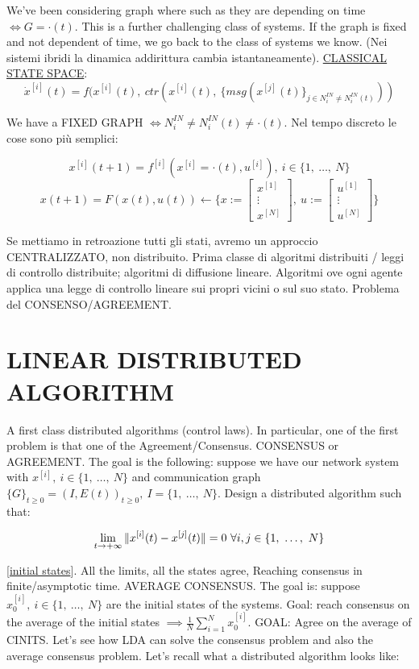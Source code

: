 We've been considering graph where such as they are depending on time $\iff G=\mathord{\cdot}(t)$. This is a further challenging class of systems. If the graph is fixed and not dependent of time, we go back to the class of systems we know. (Nei sistemi ibridi la dinamica addirittura cambia istantaneamente). \underline{CLASSICAL STATE SPACE}:
\[	
	\dot{x}^{[i]}(t) = f(x^{[i]}(t),\ ctr(x^{[i]}(t),\ \{msg(x^{[j]}(t)\}_{j\in N_i^{IN}\neq N_i^{IN}(t)}))
\]

We have a FIXED GRAPH $\iff N_i^{IN} \neq N_i^{IN}(t) \neq \mathord{\cdot}(t)$. Nel tempo discreto le cose sono più semplici:

\[
	x^{[i]}(t+1) = f^{[i]}(x^{[i]}=\mathord{\cdot}(t),u^{[i]}),\ i \in \{1,\ \dots,\ N\}
\]
\[
	x(t+1) = F(x(t),u(t)) \leftarrow \Biggl\{ x:=\begin{bmatrix}x^{[1]}\\ \vdots\\x^{[N]}\end{bmatrix},\ 
	u := \begin{bmatrix}u^{[1]}\\ \vdots\\ u^{[N]}\end{bmatrix}\Biggr\}
\]

Se mettiamo in retroazione tutti gli stati, avremo un approccio CENTRALIZZATO, non distribuito.
Prima classe di algoritmi distribuiti / leggi di controllo distribuite; algoritmi di diffusione lineare. Algoritmi ove ogni agente applica una legge di controllo lineare sui propri vicini o sul suo stato. Problema del CONSENSO/AGREEMENT.

\section{LINEAR DISTRIBUTED ALGORITHM}
A first class distributed algorithms (control laws). In particular, one of the first problem is that one of the Agreement/Consensus. CONSENSUS or AGREEMENT. The goal is the following: suppose we have our network system with $x^{[i]},\ i\in \{1,\ \dots,\ N\}$ and communication graph $\{G\}_{t\geq 0} = (I,E(t))_{t\geq 0},\ I=\{1,\ \dots,\ N\}$. Design a distributed algorithm such that:

\[
	\lim_{t\to +\infty}{\lVert x^{[i]}(t) - x^{[j]}(t)\rVert} = 0\ \forall i,j \in \{1,\ \dots,\ N\}
\]

[\underline{initial states}]. All the limits, all the states agree, Reaching consensus in finite/asymptotic time. AVERAGE CONSENSUS. The goal is: suppose $x^{[i]}_0,\ i\in \{1,\ \dots,\ N\}$ are the initial states of the systems. Goal: reach consensus on the average of the initial states $\implies \frac{1}{N}\sum_{i=1}^{N}{x^{[i]}_0}$. GOAL: Agree on the average of CINITS. Let's see how LDA can solve the consensus problem and also the average consensus problem. Let's recall what a distributed algorithm looks like:

